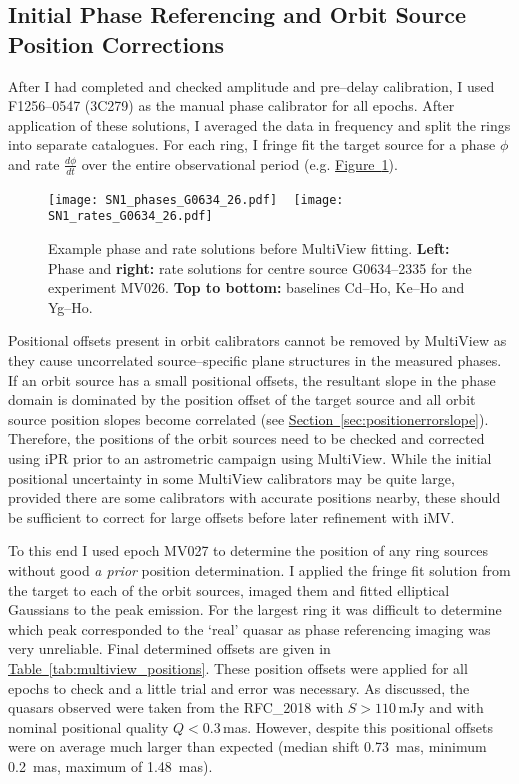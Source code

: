 		\subsection{Initial Phase Referencing and Orbit Source Position Corrections}
		After I had completed and checked amplitude and pre--delay calibration, I used F1256--0547 (3C279) as the manual phase calibrator for all epochs. After application of these solutions, I averaged the data in frequency and split the rings into separate catalogues. For each ring, I fringe fit the target source for a phase $\phi$ and rate $\frac{d \phi }{d t}$ over the entire observational period (e.g. \hyperref[fig:fringerate]{Figure~\ref*{fig:fringerate}}).
		\begin{figure}[h]
			\centering
			\texttt{[image: SN1\_phases\_G0634\_26.pdf]}
			~
			\texttt{[image: SN1\_rates\_G0634\_26.pdf]}
			\caption[SN1 MV026 G0634-2335]{Example phase and rate solutions before MultiView fitting. \textbf{Left:} Phase and \textbf{right:} rate solutions for centre source G0634--2335 for the experiment MV026. \textbf{Top to bottom:} baselines Cd--Ho, Ke--Ho and Yg--Ho.} \label{fig:fringerate}
		\end{figure}		
		Positional offsets present in orbit calibrators cannot be removed by MultiView as they cause uncorrelated source--specific plane structures in the measured phases. If an orbit source has a small positional offsets, the resultant slope in the phase domain is dominated by the position offset of the target source and all orbit source position slopes become correlated (see \hyperref[sec:positionerrorslope]{Section~\ref*{sec:positionerrorslope}}). Therefore, the positions of the orbit sources need to be checked and corrected using iPR prior to an astrometric campaign using MultiView. While the initial positional uncertainty in some MultiView calibrators may be quite large, provided there are some calibrators with accurate positions nearby, these should be sufficient to correct for large offsets before later refinement with iMV.
		
		To this end I used epoch MV027 to determine the position of any ring sources without good \textit{a prior} position determination. I applied the fringe fit solution from the target to each of the orbit sources, imaged them and fitted elliptical Gaussians to the peak emission. For the largest ring it was difficult to determine which peak corresponded to the `real' quasar as phase referencing imaging was very unreliable. Final determined offsets are given in \hyperref[tab:multiview_positions]{Table~\ref*{tab:multiview_positions}}. These position offsets were applied for all epochs to check and a little trial and error was necessary. As discussed, the quasars observed were taken from the RFC\_2018 with $S > 110$\,mJy and with nominal positional quality $Q<0.3$\,mas. However, despite this positional offsets were on average much larger than expected (median shift 0.73~mas, minimum 0.2~mas, maximum of 1.48~mas).
		

